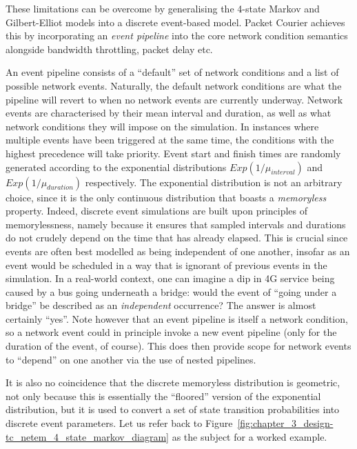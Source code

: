 \newpage

These limitations can be overcome by generalising the 4-state Markov and Gilbert-Elliot models into a discrete
event-based model\cite{discrete_event_simulation}. Packet Courier achieves this by incorporating an \emph{event
pipeline} into the core network condition semantics alongside bandwidth throttling, packet delay etc.

An event pipeline consists of a ``default'' set of network conditions and a list of possible network events.
Naturally, the default network conditions are what the pipeline will revert to when no network events are currently
underway. Network events are characterised by their mean interval and duration, as well as what network conditions
they will impose on the simulation. In instances where multiple events have been triggered at the same time, the
conditions with the highest precedence will take priority. Event start and finish times are randomly generated according
to the exponential distributions $Exp(1/\mu_{interval})$ and $Exp(1/\mu_{duration})$ respectively. The
exponential distribution is not an arbitrary choice, since it is the only continuous distribution that boasts a
\emph{memoryless} property\cite{memoryless_random_variables}. Indeed, discrete event simulations are built upon
principles of memorylessness, namely because it ensures that sampled intervals and durations do not crudely depend on
the time that has already elapsed. This is crucial since events are often best modelled as being independent of one
another, insofar as an event would be scheduled in a way that is ignorant of previous events in the simulation. In a
real-world context, one can imagine a dip in 4G service being caused by a bus going underneath a bridge: would the
event of ``going under a bridge'' be described as an \emph{independent} occurrence? The answer is almost certainly
``yes''. Note however that an event pipeline is itself a network condition, so a network event could in principle
invoke a new event pipeline (only for the duration of the event, of course). This does then provide scope for
network events to ``depend'' on one another via the use of nested pipelines.

It is also no coincidence that the discrete memoryless distribution is geometric\cite{memoryless_random_variables},
not only because this is essentially the ``floored'' version of the exponential distribution, but it is used to
convert a set of state transition probabilities into discrete event parameters. Let us refer back to
Figure~\ref{fig:chapter_3_design-tc_netem_4_state_markov_diagram} as the subject for a worked example.

